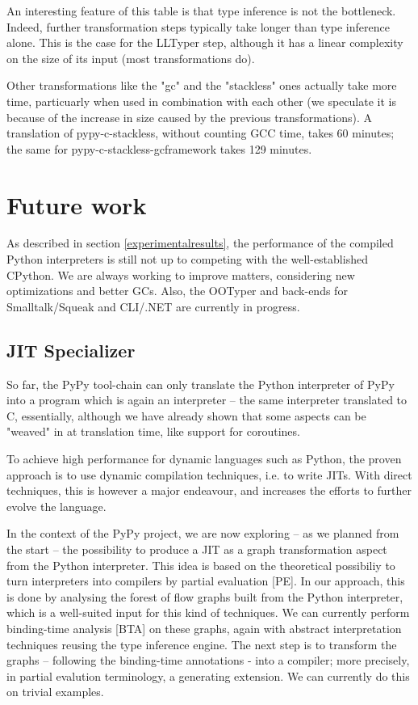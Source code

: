 \documentclass{acm_proc_article-sp}
\begin{document}
An interesting feature of this table is that type inference is not the
bottleneck.  Indeed, further transformation steps typically take longer
than type inference alone.  This is the case for the LLTyper step,
although it has a linear complexity on the size of its input (most
transformations do).

Other transformations like the "gc" and the "stackless" ones actually
take more time, particuarly when used in combination with each other (we
speculate it is because of the increase in size caused by the previous
transformations).  A translation of pypy-c-stackless, without counting
GCC time, takes 60 minutes; the same for pypy-c-stackless-gcframework
takes 129 minutes.



\section{Future work}
\label{futurework}


As described in section \ref{experimentalresults}, the performance of
the compiled Python interpreters is still not up to competing with the
well-established CPython.  We are always working to improve matters,
considering new optimizations and better GCs.  Also, the OOTyper and
back-ends for Smalltalk/Squeak and CLI/.NET are currently in progress.


\subsection{JIT Specializer}

So far, the PyPy tool-chain can only translate the Python interpreter of
PyPy into a program which is again an interpreter -- the same interpreter
translated to C, essentially, although we have already shown that some
aspects can be "weaved" in at translation time, like support for
coroutines.

To achieve high performance for dynamic languages such as Python, the
proven approach is to use dynamic compilation techniques, i.e. to write
JITs.  With direct techniques, this is however a major endeavour, and
increases the efforts to further evolve the language.

In the context of the PyPy project, we are now exploring -- as we planned
from the start -- the possibility to produce a JIT as a graph
transformation aspect from the Python interpreter.  This idea is based
on the theoretical possibiliy to turn interpreters into compilers by
partial evaluation [PE].  In our approach, this is done by analysing
the forest of flow graphs built from the Python interpreter, which is a
well-suited input for this kind of techniques.  We can currently perform
binding-time analysis [BTA] on these graphs, again with abstract
interpretation techniques reusing the type inference engine.  The next
step is to transform the graphs -- following the binding-time annotations
- into a compiler; more precisely, in partial evalution terminology, a
generating extension.  We can currently do this on trivial examples.
\end{document}
